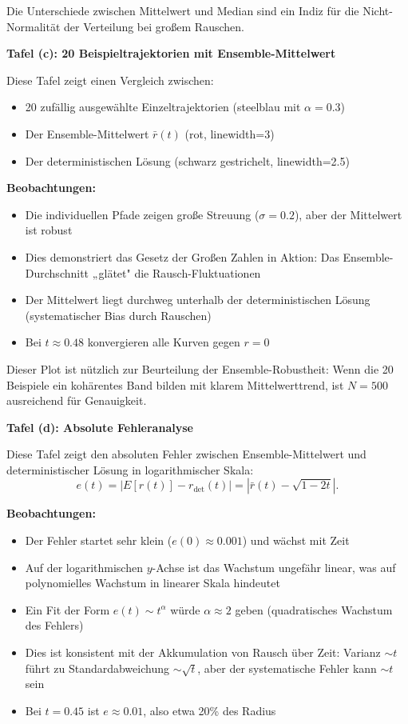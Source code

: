\documentclass[a4paper,12pt]{article}
\theoremstyle{definition}
\begin{document}
Die Unterschiede zwischen Mittelwert und Median sind ein Indiz für die Nicht-Normalität der Verteilung bei großem Rauschen.

\textbf{Tafel (c): 20 Beispieltrajektorien mit Ensemble-Mittelwert}

Diese Tafel zeigt einen Vergleich zwischen:
\begin{itemize}
	\item 20 zufällig ausgewählte Einzeltrajektorien (steelblau mit $\alpha = 0.3$)
	\item Der Ensemble-Mittelwert $\bar{r}(t)$ (rot, linewidth=3)
	\item Der deterministischen Lösung (schwarz gestrichelt, linewidth=2.5)
\end{itemize}

\textbf{Beobachtungen:}
\begin{itemize}
	\item Die individuellen Pfade zeigen große Streuung ($\sigma = 0.2$), aber der Mittelwert ist robust
	\item Dies demonstriert das Gesetz der Großen Zahlen in Aktion: Das Ensemble-Durchschnitt „glätet" die Rausch-Fluktuationen
	\item Der Mittelwert liegt durchweg unterhalb der deterministischen Lösung (systematischer Bias durch Rauschen)
	\item Bei $t \approx 0.48$ konvergieren alle Kurven gegen $r = 0$
\end{itemize}

Dieser Plot ist nützlich zur Beurteilung der Ensemble-Robustheit: Wenn die 20 Beispiele ein kohärentes Band bilden mit klarem Mittelwerttrend, ist $N = 500$ ausreichend für Genauigkeit.

\textbf{Tafel (d): Absolute Fehleranalyse}

Diese Tafel zeigt den absoluten Fehler zwischen Ensemble-Mittelwert und deterministischer Lösung in logarithmischer Skala:
\[
e(t) = |E[r(t)] - r_{\text{det}}(t)| = |\bar{r}(t) - \sqrt{1 - 2t}|.
\]

\textbf{Beobachtungen:}
\begin{itemize}
	\item Der Fehler startet sehr klein ($e(0) \approx 0.001$) und wächst mit Zeit
	\item Auf der logarithmischen $y$-Achse ist das Wachstum ungefähr linear, was auf polynomielles Wachstum in linearer Skala hindeutet
	\item Ein Fit der Form $e(t) \sim t^\alpha$ würde $\alpha \approx 2$ geben (quadratisches Wachstum des Fehlers)
	\item Dies ist konsistent mit der Akkumulation von Rausch über Zeit: Varianz $\sim t$ führt zu Standardabweichung $\sim \sqrt{t}$, aber der systematische Fehler kann $\sim t$ sein
	\item Bei $t = 0.45$ ist $e \approx 0.01$, also etwa 20\% des Radius
\end{itemize}
\end{document}
